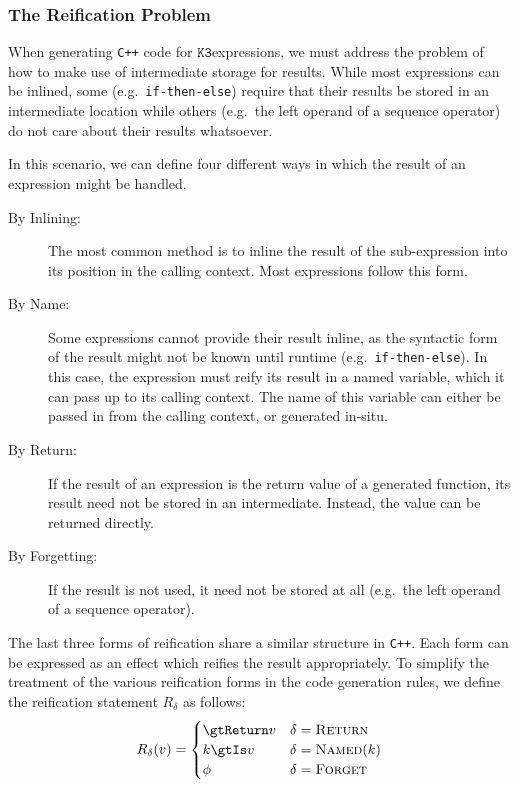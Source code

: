 \documentclass[10pt]{article}
\newcommand{\K}{\ensuremath{\texttt{K3}}}
\begin{document}
\subsubsection{The Reification Problem}

When generating \texttt{C++} code for \K expressions, we must address the problem of
how to make use of intermediate storage for results. While most expressions can be inlined, some
(e.g.~\texttt{if-then-else}) require that their results be stored in an intermediate location
while others (e.g.~the left operand of a sequence operator) do not care about their results
whatsoever.

In this scenario, we can define four different ways in which the result of an expression might
be handled.

\begin{description}
    \item[By Inlining:] The most common method is to inline the result of the sub-expression
        into its position in the calling context. Most expressions follow this form.
    \item[By Name:] Some expressions cannot provide their result inline, as the syntactic form
        of the result might not be known until runtime (e.g.~\texttt{if-then-else}). In this
        case, the expression must reify its result in a named variable, which it can pass up to
        its calling context. The name of this variable can either be passed in from the calling
        context, or generated in-situ.
    \item[By Return:] If the result of an expression is the return value of a generated
        function, its result need not be stored in an intermediate. Instead, the value can be
        returned directly.
    \item[By Forgetting:] If the result is not used, it need not be stored at all (e.g.~the left
        operand of a sequence operator).
\end{description}

The last three forms of reification share a similar structure in \texttt{C++}. Each form can be
expressed as an effect which reifies the result appropriately. To simplify the treatment of the
various reification forms in the code generation rules, we define the reification statement
$R_\delta$ as follows:
%
\begin{align*}
    R_\delta(v) = \begin{cases}
        \gtReturn v & \delta = \textsc{Return} \\
        k \gtIs v & \delta = \textsc{Named$(k)$} \\
        \phi & \delta = \textsc{Forget}
    \end{cases}
\end{align*}
\end{document}
